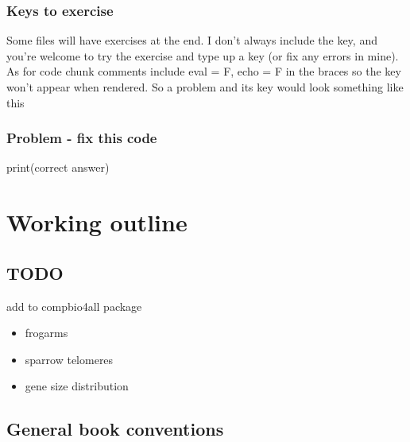 \documentclass[
]{book}
\newenvironment{Shaded}{\begin{snugshade}}{\end{snugshade}}
\newcommand{\FunctionTok}[1]{\textcolor[rgb]{0.00,0.00,0.00}{#1}}
\newcommand{\NormalTok}[1]{#1}
\providecommand{\tightlist}{%
  \setlength{\itemsep}{0pt}\setlength{\parskip}{0pt}}
\begin{document}
\hypertarget{keys-to-exercise}{%
\subsection{Keys to exercise}\label{keys-to-exercise}}

Some files will have exercises at the end. I don't always include the key, and you're welcome to try the exercise and type up a key (or fix any errors in mine). As for code chunk comments include eval = F, echo = F in the braces so the key won't appear when rendered. So a problem and its key would look something like this

\hypertarget{problem---fix-this-code}{%
\subsection{Problem - fix this code}\label{problem---fix-this-code}}

\begin{Shaded}
\begin{Highlighting}[]
\FunctionTok{print}\NormalTok{(correct answer)}
\end{Highlighting}
\end{Shaded}

\hypertarget{working-outline}{%
\chapter*{Working outline}\label{working-outline}}

\hypertarget{todo}{%
\section{TODO}\label{todo}}

add to compbio4all package

\begin{itemize}
\tightlist
\item
  frogarms
\item
  sparrow telomeres
\item
  gene size distribution
\end{itemize}

\hypertarget{general-book-conventions}{%
\section{General book conventions}\label{general-book-conventions}}
\end{document}
